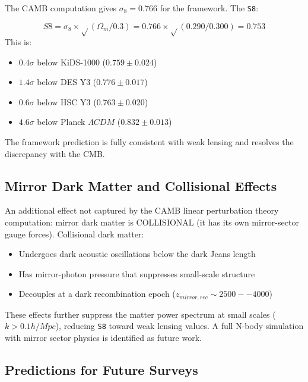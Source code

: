 \documentclass[aps,prd,preprint,superscriptaddress,longbibliography]{revtex4-2}
\begin{document}
The CAMB computation gives $\sigma_{8} = 0.766$ for the framework. The \texttt{S8}:


\begin{equation}
    S8 = \sigma_{8} \times \sqrt{}(\Omega_m/0.3) = 0.766 \times \sqrt{}(0.290/0.300) = 0.753
\end{equation}
This is:

\begin{itemize}
  \item $0.4\sigma$ below KiDS-1000 ($0.759 \pm 0.024$)
  \item $1.4\sigma$ below DES Y3 ($0.776 \pm 0.017$)
  \item $0.6\sigma$ below HSC Y3 ($0.763 \pm 0.020$)
  \item $4.6\sigma$ below Planck $\Lambda CDM$ ($0.832 \pm 0.013$)
\end{itemize}

The framework prediction is fully consistent with weak lensing and resolves the discrepancy with the CMB.



\subsection{Mirror Dark Matter and Collisional Effects}

An additional effect not captured by the CAMB linear perturbation theory computation: mirror dark matter is COLLISIONAL (it has its own mirror-sector gauge forces). Collisional dark matter:


\begin{itemize}
  \item Undergoes dark acoustic oscillations below the dark Jeans length
  \item Has mirror-photon pressure that suppresses small-scale structure
  \item Decouples at a dark recombination epoch ($z_{mirror,rec} \sim  2500--4000$)
\end{itemize}

These effects further suppress the matter power spectrum at small scales ($k > 0.1 h/Mpc$), reducing \texttt{S8} toward weak lensing values. A full N-body simulation with mirror sector physics is identified as future work.



\subsection{Predictions for Future Surveys}
\end{document}
